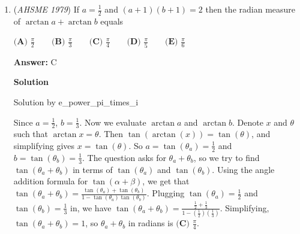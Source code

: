 \begin{enumerate}
 Notice that the solutions to the equation $x^{256}-1=0$ are the $256$ roots of unity. Then the solutions to the equation $x^{256}-256^{32}=0$ are the $256$ roots of unity dilated by $\sqrt[256]{256^{32}} = \sqrt[256]{2^{256}} = 2$. However, the only real solutions to the equation are the first root of unity and the root of unity opposite of it, as both are on the real axis in the complex plane. These two roots of unity are $\pm1$, and dilating by $2$ gives $\pm2$. The sum of the squares is $(2)^2+(-2)^2 = \boxed{\textbf{(A) } 8}$




\textbf{Solution 2}

Notice that we can change the equation to be $x^{256}=256^{32}$.

 The RHS can be simplified to $x^{256}=2^{256}$

 Hence, the only real solutions are $x=-2,2$

 Hence, $(-2)^2+(2)^2=8=\boxed{A}$.

 


	\item (\textit{AHSME 1979}) If $a=\frac{1}{2}$ and $(a+1)(b+1)=2$ then the radian measure of $\arctan a + \arctan b$ equals


 $\textbf{(A) }\frac{\pi}{2}\qquad \textbf{(B) }\frac{\pi}{3}\qquad \textbf{(C) }\frac{\pi}{4}\qquad \textbf{(D) }\frac{\pi}{5}\qquad \textbf{(E) }\frac{\pi}{6}$

 \textbf{Answer: }C



\textbf{Solution}

Solution by e\_power\_pi\_times\_i

 Since $a=\frac{1}{2}$, $b=\frac{1}{3}$. Now we evaluate $\arctan a$ and $\arctan b$. Denote $x$ and $\theta$ such that $\arctan x = \theta$. Then $\tan(\arctan(x)) = \tan(\theta)$, and simplifying gives $x = \tan(\theta)$. So $a = \tan(\theta_a) = \frac{1}{2}$ and $b = \tan(\theta_b) = \frac{1}{3}$. The question asks for $\theta_a + \theta_b$, so we try to find $\tan(\theta_a + \theta_b)$ in terms of $\tan(\theta_a)$ and $\tan(\theta_b)$. Using the angle addition formula for $\tan(\alpha+\beta)$, we get that $\tan(\theta_a + \theta_b) = \frac{\tan(\theta_a)+\tan(\theta_b)}{1-\tan(\theta_a)\tan(\theta_b)}$. Plugging $\tan(\theta_a) = \frac{1}{2}$ and $\tan(\theta_b) = \frac{1}{3}$ in, we have $\tan(\theta_a + \theta_b) = \frac{\frac{1}{2}+\frac{1}{3}}{1-(\frac{1}{2})(\frac{1}{3})}$. Simplifying, $\tan(\theta_a + \theta_b) = 1$, so $\theta_a + \theta_b$ in radians is $\boxed{\textbf{(C) } \frac{\pi}{4}}$.


\end{enumerate}
